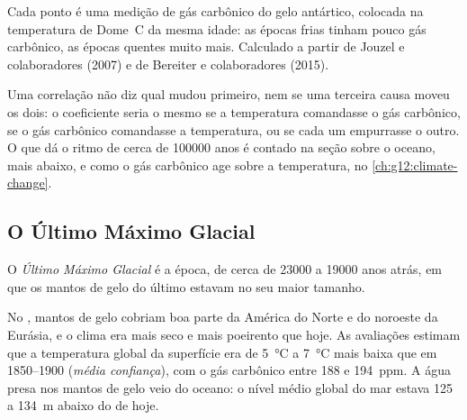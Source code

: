 \begin{omfigure}

{\small Cada ponto é uma medição de gás carbônico do gelo antártico,
colocada na temperatura de Dome~C da mesma idade: as épocas frias tinham
pouco gás carbônico, as épocas quentes muito mais. Calculado a partir de
Jouzel e colaboradores (2007) e de Bereiter e colaboradores (2015).}
\end{omfigure}

Uma correlação não diz qual mudou primeiro, nem se uma terceira causa moveu
os dois: o coeficiente seria o mesmo se a temperatura comandasse o gás
carbônico, se o gás carbônico comandasse a temperatura, ou se cada um
empurrasse o outro. O que dá o ritmo de cerca de \num{100000} anos é contado
na seção sobre o oceano, mais abaixo, e como o gás carbônico age sobre a
temperatura, no \cref{ch:g12:climate-change}.

\subsection{O Último Máximo Glacial}

\begin{definition}\label{def:g12:past-climates:lgm}
O \emph{Último Máximo Glacial} é a época, de cerca de
\num{23000} a \num{19000} anos atrás, em que os mantos de gelo do último
 estavam no seu maior tamanho.
\end{definition}

No , mantos de gelo cobriam boa parte da América do
Norte e do noroeste da Eurásia, e o clima era mais seco e mais poeirento que
hoje. As avaliações estimam que a temperatura global da superfície era de
\qty{5}{\degreeCelsius} a \qty{7}{\degreeCelsius} mais baixa que em 1850--1900
(\emph{média confiança}), com o gás carbônico entre 188 e \qty{194}{ppm}.
A água presa nos mantos de gelo veio do oceano: o nível médio global do mar
estava 125 a \qty{134}{m} abaixo do de hoje.


